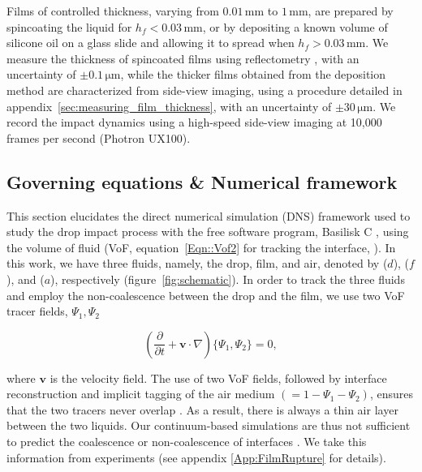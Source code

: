 Films of controlled thickness, varying from $0.01\,\si{\milli\meter}$ to $1\,\si{\milli\meter}$, are prepared by spincoating the liquid for $h_f < 0.03\,\si{\milli\meter}$, or by depositing a known volume of silicone oil on a glass slide and allowing it to spread when $h_f > 0.03\,\si{\milli\meter}$.  We measure the thickness of spincoated films using reflectometry \citep{reizman1965optical}, with an uncertainty of $\pm 0.1\,\si{\micro\meter}$, while the thicker films obtained from the deposition method are characterized from side-view imaging, using a procedure detailed in appendix~\ref{sec:measuring_film_thickness}, with an uncertainty of $\pm 30\,\si{\micro\meter}$. We record the impact dynamics using a high-speed side-view imaging at 10,000 frames per second (Photron UX100).

\subsection{Governing equations \& Numerical framework}
\label{subsec:numerical methods}
This section elucidates the direct numerical simulation (DNS) framework used to study the drop impact process with the free software program, Basilisk C \citep{basiliskpopinet1}, using the volume of fluid (VoF, equation~\eqref{Eqn::Vof2} for tracking the interface, \citealt{prosperetti2009computational, tryggvason2011direct}). In this work, we have three fluids, namely, the drop, film, and air, denoted by ($d$), ($f$), and ($a$), respectively (figure~\ref{fig:schematic}). In order to track the three fluids and employ the non-coalescence between the drop and the film, we use two VoF tracer fields, $\Psi_1, \Psi_2$ \citep{ramirez2020lifting}

\begin{equation}
	\label{Eqn::Vof2}
	\left(\frac{\partial}{\partial t} + \boldsymbol{v\cdot}\nabla\right)\{\Psi_1, \Psi_2\} = 0,
\end{equation}

\noindent where $\boldsymbol{v}$ is the velocity field. 
The use of two VoF fields, followed by interface reconstruction and implicit tagging of the air medium $\left(= 1 - \Psi_1 - \Psi_2\right)$, ensures that the two tracers never overlap \citep{ramirez2020lifting, naru2021numerical}. As a result, there is always a thin air layer between the two liquids. Our continuum-based simulations are thus not sufficient to predict the coalescence or non-coalescence of interfaces \citep{SprittlesPhysRevLett.124.084501}.
We take this information from experiments (see appendix \ref{App:FilmRupture} for details).

